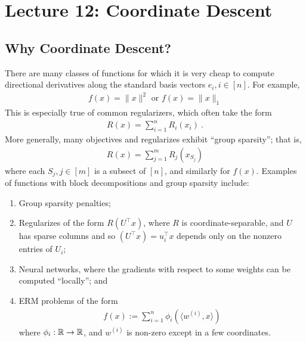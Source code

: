 \section{Lecture 12: Coordinate Descent}
\subsection{Why Coordinate Descent?}
There are many classes of functions for which it is very cheap 
to compute directional derivatives along the standard basis vectors
$e_i, i \in [n]$.
%
For example, 
%
\begin{eqnarray}
f(x) = \|x\|^2 \text{ or } f(x) = \|x\|_1
\end{eqnarray}
%
This is especially true of common regularizers, 
%
which often take the form 
\begin{eqnarray}
R(x) = \sum_{i=1}^n R_i(x_i) \ .
\end{eqnarray}
%
More generally, many objectives and regularizes exhibit ``group sparsity''; that is,
%
\begin{eqnarray}
R(x) =  \sum_{j=1}^m R_{j}(x_{S_j})
\end{eqnarray}
where each $S_j, j \in [m]$ is a subsect of $[n]$, and similarly for $f(x)$.
%
Examples of functions with block decompositions and group sparsity include:
\begin{enumerate} 
	\item Group sparsity penalties;
	\item Regularizes of the form $R(U^\top x)$, where $R$ is
    coordinate-separable, and $U$ has sparse columns and so
    $(U^\top x) = u_i^\top x$ depends only on the nonzero entries of $U_i$;
	\item Neural networks, where the gradients with respect to some weights can be
    computed ``locally''; and
	\item ERM problems of the form 
    \begin{eqnarray}
    f(x) := \sum_{i=1}^n \phi_i(\langle w^{(i)} , x \rangle )
    \end{eqnarray}
    where $\phi_i: \mathbb{R} \to \mathbb{R}$, and $w^{(i)}$ is non-zero except in a few coordinates. 
\end{enumerate} 


